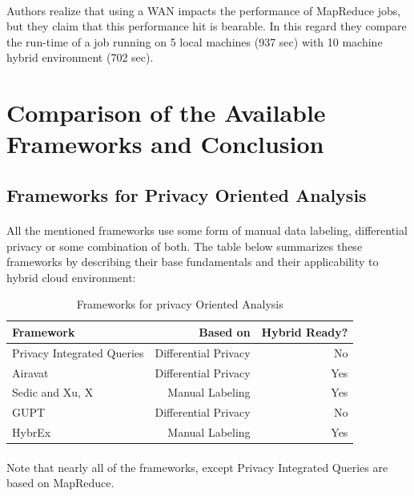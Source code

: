 \documentclass[12pt]{report}
\theoremstyle{named}
\begin{document}
\paragraph{}
Authors realize that using a WAN impacts the performance of MapReduce jobs, but they claim that this performance hit is bearable. In this regard they compare the run-time of a job running on 5 local machines (937 sec) with 10 machine hybrid environment (702 sec).

\section{Comparison of the Available Frameworks and Conclusion}
\subsection{Frameworks for Privacy Oriented Analysis}
\paragraph{}
All the mentioned frameworks use some form of manual data labeling, differential privacy or some combination of both. The table below summarizes these frameworks by describing their base fundamentals and their applicability to hybrid cloud environment:



\begin{table}[ht]
\centering
\begin{tabular}{@{}lrr@{}}
\toprule
\textbf{Framework} & \multicolumn{1}{r}{\textbf{Based on}} & \textbf{Hybrid Ready?} \\ \midrule
Privacy Integrated Queries \cite{mcsherry2009privacy} & Differential Privacy & No \\
Airavat \cite{roy2010airavat} & Differential Privacy & Yes \\
Sedic \cite{zhang2011sedic} and Xu, X \cite{xu2015framework} & Manual Labeling & Yes \\
GUPT \cite{mohan2012gupt} & Differential Privacy & No \\
HybrEx \cite{ko2011hybrex} & Manual Labeling & Yes \\ \bottomrule
\end{tabular}
\caption{Frameworks for privacy Oriented Analysis}
\label{Frameworks for privacy Oriented Analysis}
\end{table}




\paragraph{}
Note that nearly all of the frameworks, except Privacy Integrated Queries are based on MapReduce.
\end{document}
